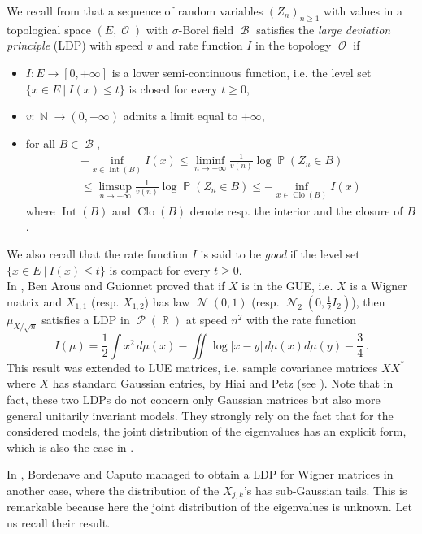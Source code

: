 \documentclass[11pt,a4paper]{article}
\DeclareMathOperator{\N}{\mathbb{N}}
\DeclareMathOperator{\R}{\mathbb{R}}
\DeclareMathOperator{\PR}{\mathbb{P}}
\DeclareMathOperator{\BB}{\mathcal{B}}
\DeclareMathOperator{\NN}{\mathcal{N}}
\DeclareMathOperator{\OO}{\mathcal{O}}
\DeclareMathOperator{\PP}{\mathcal{P}}
\DeclareMathOperator{\1}{\mathbf{1}}
\DeclareMathOperator{\Int}{\mathrm{Int}}
\DeclareMathOperator{\Adh}{\mathrm{Clo}}
\theoremstyle{definition}
\begin{document}
We recall from \cite{DZ} that a sequence of random variables $(Z_n)_{n \ge 1}$ with values in a topological space $(E,\OO)$ with $\sigma$-Borel field $\BB$ satisfies the \emph{large deviation principle} (LDP) with speed $v$ and rate function $I$ in the topology $\OO$ if
\begin{itemize}
\item $I : E \to [0,+\infty]$ is a lower semi-continuous function, i.e. the level set $\{x \in E \ | \ I(x) \le t\}$ is closed for every $t \ge 0$,
\item $v : \N \to (0,+\infty)$ admits a limit equal to $+\infty$,
\item for all $B \in \BB$,
\begin{multline*}
-\inf_{x \in \Int(B)} I(x) \le \liminf_{n \to +\infty} \frac{1}{v(n)} \log \PR(Z_n \in B) \\
\le \limsup_{n \to +\infty} \frac{1}{v(n)} \log \PR(Z_n \in B) \le -\inf_{x \in \Adh(B)} I(x)
\end{multline*}
where $\Int(B)$ and $\Adh(B)$ denote resp. the interior and the closure of $B$.
\end{itemize}
We also recall that the rate function $I$ is said to be \emph{good} if the level set $\{x \in E \ | \ I(x) \le t\}$ is compact for every $t \ge 0$.\\

In \cite{BAG}, Ben Arous and Guionnet proved that if $X$ is in the GUE, i.e. $X$ is a Wigner matrix and $X_{1,1}$ (resp. $X_{1,2}$) has law $\NN(0,1)$ (resp. $\NN_2 \left( 0,\frac12 I_2 \right)$), then $\mu_{X/\sqrt{n}}$ satisfies a LDP in $\PP(\R)$ at speed $n^2$ with the rate function
\begin{displaymath}
I(\mu) = \frac12 \int x^2 \, d\mu(x) - \iint \log|x-y| \, d\mu(x) d\mu(y) - \frac34 \, .
\end{displaymath}
This result was extended to LUE matrices, i.e. sample covariance matrices $XX^*$ where $X$ has standard Gaussian entries, by Hiai and Petz (see \cite{HP}). Note that in fact, these two LDPs do not concern only Gaussian matrices but also more general unitarily invariant models. They strongly rely on the fact that for the considered models, the joint distribution of the eigenvalues has an explicit form, which is also the case in \cite{ESS}.

In \cite{BC}, Bordenave and Caputo managed to obtain a LDP for Wigner matrices in another case, where the distribution of the $X_{j,k}$'s has sub-Gaussian tails. This is remarkable because here the joint distribution of the eigenvalues is unknown. Let us recall their result.
\end{document}
